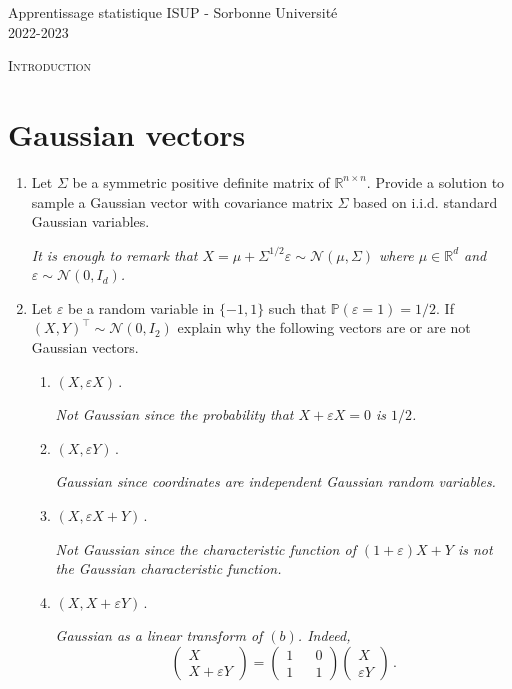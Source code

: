 \documentclass[a4paper,10pt,fleqn]{article}
\newcommand{\eqsp}{\,}
\newcommand{\rset}{\ensuremath{\mathbb{R}}}
\newcommand{\bP}{\mathbb{P}}
\newcommand{\X}{\ensuremath{\mathcal{X}}}
\newcommand{\1}{\ensuremath{\mathbbm{1}}}
\begin{document}
\noindent Apprentissage statistique \hfill ISUP - Sorbonne Universit\'e \\
 2022-2023

\noindent\hrulefill

\begin{center}
\textsc{Introduction}
\end{center}
\hrulefill

\medskip


\section*{Gaussian vectors}
\begin{enumerate}
\item Let $\Sigma$ be a symmetric positive definite matrix of $\rset^{n\times n}$. Provide a solution to sample a Gaussian vector with covariance matrix $\Sigma$ based on i.i.d. standard Gaussian variables.

\vspace{.2cm}

{\em
It is enough to remark that $X = \mu +\Sigma^{1/2}\varepsilon \sim\mathcal{N}(\mu,\Sigma)$ where $\mu\in\rset^d$ and $\varepsilon \sim \mathcal{N}(0,I_d)$.
}

\item Let $\varepsilon$ be a random variable in $\{-1,1\}$ such that $\bP(\varepsilon = 1) = 1/2$. If $(X,Y)^\top\sim \mathcal{N}(0,I_2)$ explain why the following vectors are or are not Gaussian vectors.
\begin{enumerate}
\item $(X,\varepsilon X)$\eqsp.

{\em
Not Gaussian since the probability that  $X +\varepsilon X = 0$ is $1/2$.
}
\item $(X,\varepsilon Y)$\eqsp.

{\em
Gaussian since coordinates are independent Gaussian random variables.
}
\item $(X,\varepsilon X + Y)$\eqsp.

{\em
Not Gaussian since the characteristic function of $(1+\varepsilon) X + Y$ is not the Gaussian characteristic function.
}
\item $(X,X + \varepsilon Y)$\eqsp.

{\em
Gaussian as a linear transform of $(b)$. Indeed,
$$
\begin{pmatrix} X \\X + \varepsilon Y\end{pmatrix} = \begin{pmatrix} 1 && 0 \\1 && 1\end{pmatrix}\begin{pmatrix} X \\ \varepsilon Y\end{pmatrix}\eqsp.
$$
}
\end{enumerate}



\end{enumerate}
\end{document}
